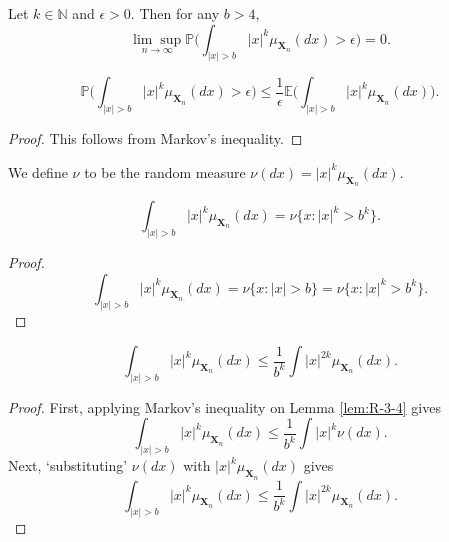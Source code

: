 \begin{lemma}
  \notready
  \label{lem:weak_convergence}
  Let $k \in \mathbb{N}$ and $\epsilon > 0$. Then for any $b > 4$,
  \[
  \underset{n \rightarrow \infty}{\lim \sup} \mathbb{P} \biggl( \int_{|x| > b} |x|^k \mu_{\mathbf{X}_n}(dx) > \epsilon \biggl) = 0.
  \]
\end{lemma}
\begin{lemma}[R-3-2 : lem:R-3-2]
  \notready
  \label{lem:R-3-2}
  \uses{}
  \[
  \mathbb{P} \biggl( \int_{|x| > b} |x|^k \mu_{\mathbf{X}_n}(dx) > \epsilon \biggl) \leq \frac{1}{\epsilon} \mathbb{E} \biggl( \int_{|x| > b} |x|^k \mu_{\mathbf{X}_n}(dx) \biggl).
  \]
\end{lemma}
\begin{proof}
  This follows from Markov's inequality.
\end{proof}
\begin{definition}[R-3-3 : def:R-3-3]
  \notready
  \label{def:R-3-3}
  \uses{} %
  We define $\nu$ to be the random measure $\nu(dx) = |x|^k \mu_{\mathbf{X}_n}(dx)$.
\end{definition}
\begin{lemma}[R-3-4 : lem:R-3-4]
  \notready
  \label{lem:R-3-4}
  \[
  \int_{|x| > b} |x|^k \mu_{\mathbf{X}_n}(dx) = \nu\{x : |x|^k > b^k\}.
  \]
\end{lemma}
\begin{proof}
  \[
  \int_{|x| > b} |x|^k \mu_{\mathbf{X}_n}(dx) = \nu\{x : |x| > b\} = \nu\{x : |x|^k > b^k\}.
  \]
\end{proof}
\begin{lemma}[R-3-5 : lem:R-3-5]
  \notready
  \label{lem:R-3-5}
  \[
  \int_{|x| > b} |x|^k \mu_{\mathbf{X}_n}(dx) \leq \frac{1}{b^k} \int |x|^{2k} \mu_{\mathbf{X}_n}(dx).
  \]
\end{lemma}
\begin{proof}
  First, applying Markov's inequality on Lemma \ref{lem:R-3-4} gives
  \[
  \int_{|x| > b} |x|^k \mu_{\mathbf{X}_n}(dx) \leq \frac{1}{b^k} \int |x|^k \nu(dx).
  \] 
  Next, `substituting' $\nu(dx)$ with $|x|^k \mu_{\mathbf{X}_n}(dx)$ gives
  \[
  \int_{|x| > b} |x|^k \mu_{\mathbf{X}_n}(dx) \leq \frac{1}{b^k} \int |x|^{2k} \mu_{\mathbf{X}_n}(dx).
  \] 
\end{proof}
